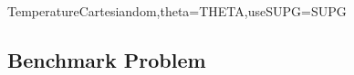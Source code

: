 \begin{classdesc}{TemperatureCartesian}{dom,theta=THETA,useSUPG=SUPG}
\end{classdesc}

\subsection{Benchmark Problem}














